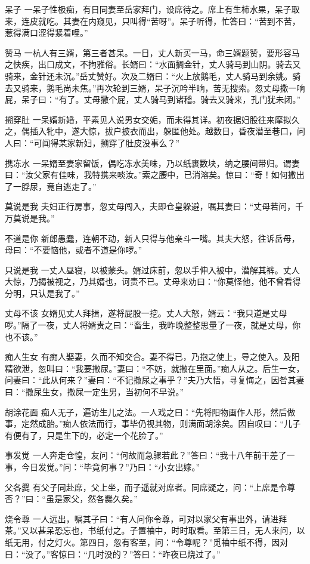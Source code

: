 \documentclass[12pt,UTF8]{ctexbook}
\begin{document}
呆子
一呆子性极痴，有日同妻至岳家拜门，设席待之。席上有生柿水果，呆子取来，连皮就吃。其妻在内窥见，只叫得“苦呀”。呆子听得，忙答曰：“苦到不苦，惹得满口涩得紧着哩。”

赞马
一杭人有三婿，第三者甚呆。一日，丈人新买一马，命三婿题赞，要形容马之快疾，出口成文，不拘雅俗。长婿曰：“水面搁金针，丈人骑马到山阴。骑去又骑来，金针还未沉。”岳丈赞好。次及二婿曰：“火上放鹅毛，丈人骑马到余姚。骑去又骑来，鹅毛尚未焦。”再次轮到三婿，呆子沉吟半晌，苦无搜索。忽丈母撒一响屁，呆子曰：“有了。丈母撒个屁，丈人骑马到诸稽。骑去又骑来，孔门犹未闭。”

搠穿肚
一呆婿新婚，平素见人说男女交姤，而未得其详。初夜据妇股往来摩拟久之，偶插入牝中，遂大惊，拔户披衣而出，躲匿他处。越数日，昏夜潜至巷口，问人曰：“可闻得某家新妇，搠穿了肚皮没事么？”

携冻水
一呆婿至妻家留饭，偶吃冻水美味，乃以纸裹数块，纳之腰间带归。谓妻曰：“汝父家有佳味，我特携来啖汝。”索之腰中，已消溶矣。惊曰：“奇！如何撒出了一脬尿，竟自逃走了。”

莫说是我
夫妇正行房事，忽丈母闯入，夫即仓皇躲避，嘱其妻曰：“丈母若问，千万莫说是我。”

不道是你
新郎愚蠢，连朝不动，新人只得与他亲斗一嘴。其夫大怒，往诉岳母，母曰：“不要恼他，或者不道是你啰。”

只说是我
一丈人昼寝，以被蒙头。婿过床前，忽以手伸入被中，潜解其裤。丈人大惊，乃揭被视之，乃其婿也，诃责不已。丈母来劝曰：“你莫怪他，他不曾看得分明，只认是我了。”

丈母不该
女婿见丈人拜揖，遂将屁股一挖。丈人大怒，婿云：“我只道是丈母啰。”隔了一夜，丈人将婿责之曰：“畜生，我昨晚整整思量了一夜，就是丈母，你也不该。”

痴人生女
有痴人娶妻，久而不知交合。妻不得已，乃抱之使上，导之使入。及阳精欲泄，忽叫曰：“我要撒尿。”妻曰：“不妨，就撒在里面。”痴人从之。后生一女，问妻曰：“此从何来？”妻曰：“不记撒尿之事乎？”夫乃大悟，寻复悔之，因咎其妻曰：“撒尿生女，撒屎一定生男，当初何不早说。”

胡涂花面
痴人无子，遍访生儿之法。一人戏之曰：“先将阳物画作人形，然后做事，定然成胎。”痴人依法而行，事毕仍视其物，则满面胡涂矣。因自叹曰：“儿子有便有了，只是生下的，必定一个花脸了。”

事发觉
一人奔走仓惶，友问：“何故而急骤若此？”答曰：“我十八年前干差了一事，今日发觉。”问：“毕竟何事？”乃曰：“小女出嫁。”

父各爨
有父子同赴席，父上坐，而子遥就对席者。同席疑之，问：“上席是令尊否？”曰：“虽是家父，然各爨久矣。”

烧令尊
一人远出，嘱其子曰：“有人问你令尊，可对以家父有事出外，请进拜茶。”又以甚呆恐忘也，书纸付之。子置袖中，时时取看。至第三日，无人来问，以纸无用，付之灯火。第四日，忽有客至，问：“令尊呢？”觅袖中纸不得，因对曰：“没了。”客惊曰：“几时没的？”答曰：“昨夜已烧过了。”
\end{document}
